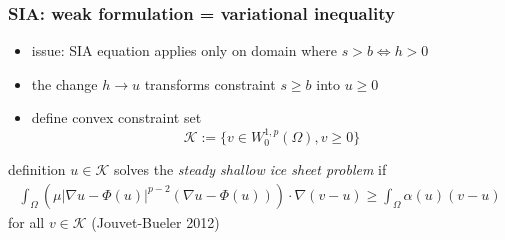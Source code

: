 \documentclass{beamer}
\newcommand{\Kcal}{\mathcal{K}}
\begin{document}
\begin{frame}
  \frametitle{SIA: weak formulation = variational inequality} 

\begin{itemize}
\item issue: SIA equation applies only on domain where $s>b \iff h > 0$
\item the change $h \to u$ transforms  constraint $s \ge b$ into $u \ge 0$
\item define convex constraint set
  $$\Kcal := \{ v \in W^{1,p}_0 (\Omega), v \ge 0 \}$$
\end{itemize}

\begin{block}{definition} 
$u \in \Kcal$ solves the \emph{steady shallow ice sheet problem} if
\begin{align*}
\int_{\Omega}    \left( \mu  | \nabla u - \Phi(u) |^{p-2} 
( \nabla u - \Phi(u) )    \right)  \cdot \nabla ( v - u )  
\ge \int_{\Omega} \alpha(u) (  v -  u ) 
\end{align*}
for all $v \in \Kcal$ \hfill \scriptsize (Jouvet-Bueler 2012)
\end{block}
\end{frame}
\end{document}
